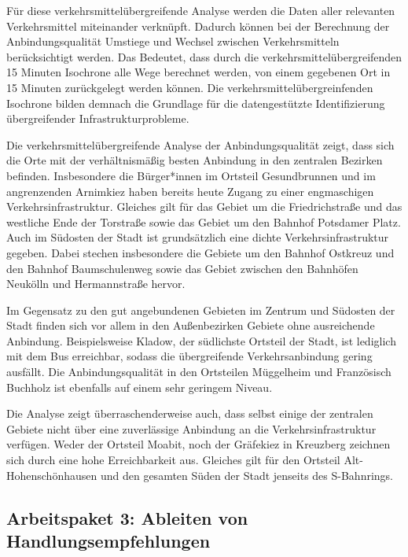Für diese verkehrsmittelübergreifende Analyse werden die Daten aller relevanten Verkehrsmittel miteinander verknüpft. Dadurch können bei der Berechnung der Anbindungsqualität Umstiege und Wechsel zwischen Verkehrsmitteln berücksichtigt werden. Das Bedeutet, dass durch die verkehrsmittelübergreifenden 15 Minuten Isochrone alle Wege berechnet werden, von einem gegebenen Ort in 15 Minuten zurückgelegt werden können. Die verkehrsmittelübergreinfenden Isochrone bilden demnach die Grundlage für die datengestützte Identifizierung übergreifender Infrastrukturprobleme.



Die verkehrsmittelübergreifende Analyse der Anbindungsqualität zeigt, dass sich die Orte mit der verhältnismäßig besten Anbindung in den zentralen Bezirken befinden. Insbesondere die Bürger*innen im Ortsteil Gesundbrunnen und im angrenzenden Arnimkiez haben bereits heute Zugang zu einer engmaschigen Verkehrsinfrastruktur. Gleiches gilt für das Gebiet um die Friedrichstraße und das westliche Ende der Torstraße sowie das Gebiet um den Bahnhof Potsdamer Platz. Auch im Südosten der Stadt ist grundsätzlich eine dichte Verkehrsinfrastruktur gegeben. Dabei stechen insbesondere die Gebiete um den Bahnhof Ostkreuz und den Bahnhof Baumschulenweg sowie das Gebiet zwischen den Bahnhöfen Neukölln und Hermannstraße hervor.

Im Gegensatz zu den gut angebundenen Gebieten im Zentrum und Südosten der Stadt finden sich vor allem in den Außenbezirken Gebiete ohne ausreichende Anbindung. Beispielsweise Kladow, der südlichste Ortsteil der Stadt, ist lediglich mit dem Bus erreichbar, sodass die übergreifende Verkehrsanbindung gering ausfällt. Die Anbindungsqualität in den Ortsteilen Müggelheim und Französisch Buchholz ist ebenfalls auf einem sehr geringem Niveau.

Die Analyse zeigt überraschenderweise auch, dass selbst einige der zentralen Gebiete nicht über eine zuverlässige Anbindung an die Verkehrsinfrastruktur verfügen. Weder der Ortsteil Moabit, noch der Gräfekiez in Kreuzberg zeichnen sich durch eine hohe Erreichbarkeit aus. Gleiches gilt für den Ortsteil Alt-Hohenschönhausen und den gesamten Süden der Stadt jenseits des S-Bahnrings.

\subsection{Arbeitspaket 3: Ableiten von Handlungsempfehlungen}
\label{arbeitspaket_3_ableiten_von_handlungsempfehlungen}


